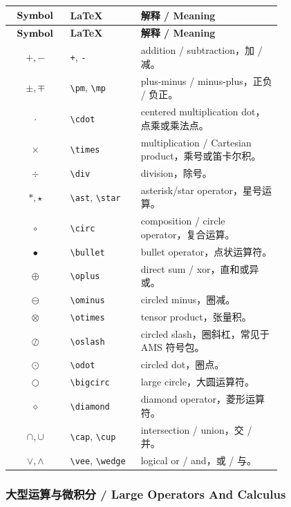 \documentclass[11pt]{article}
\begin{document}
\begin{longtable}{>{$}c<{$} p{0.26\linewidth} p{0.52\linewidth}}
\hline
\text{\textbf{Symbol}} & \textbf{LaTeX} & \textbf{解释 / Meaning} \\
\hline
\endfirsthead
\hline
\text{\textbf{Symbol}} & \textbf{LaTeX} & \textbf{解释 / Meaning} \\
\hline
\endhead
+, - & \verb|+|, \verb|-| & addition / subtraction，加 / 减。 \\
\pm, \mp & \verb|\pm|, \verb|\mp| & plus-minus / minus-plus，正负 / 负正。 \\
\cdot & \verb|\cdot| & centered multiplication dot，点乘或乘法点。 \\
\times & \verb|\times| & multiplication / Cartesian product，乘号或笛卡尔积。 \\
\div & \verb|\div| & division，除号。 \\
\ast, \star & \verb|\ast|, \verb|\star| & asterisk/star operator，星号运算。 \\
\circ & \verb|\circ| & composition / circle operator，复合运算。 \\
\bullet & \verb|\bullet| & bullet operator，点状运算符。 \\
\oplus & \verb|\oplus| & direct sum / xor，直和或异或。 \\
\ominus & \verb|\ominus| & circled minus，圈减。 \\
\otimes & \verb|\otimes| & tensor product，张量积。 \\
⊘ & \verb|\oslash| & circled slash，圈斜杠，常见于 AMS 符号包。 \\
\odot & \verb|\odot| & circled dot，圈点。 \\
\bigcirc & \verb|\bigcirc| & large circle，大圆运算符。 \\
\diamond & \verb|\diamond| & diamond operator，菱形运算符。 \\
\cap, \cup & \verb|\cap|, \verb|\cup| & intersection / union，交 / 并。 \\
\vee, \wedge & \verb|\vee|, \verb|\wedge| & logical or / and，或 / 与。 \\
\hline
\end{longtable}

\subsubsection{大型运算与微积分 / Large Operators And Calculus}
\end{document}
